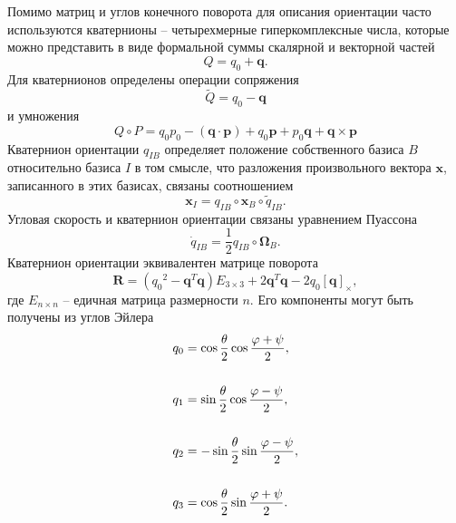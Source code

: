 Помимо матриц и углов конечного поворота для описания ориентации часто используются кватернионы \cite{Amelkin01} -- четырехмерные гиперкомплексные числа, которые можно представить в виде формальной суммы скалярной и векторной частей
\begin{equation} \label{eq:quat_def}
Q = q_0 + \bm{q}.
\end{equation}
Для кватернионов определены операции сопряжения
\begin{equation} \label{eq:quat_dual}
\tilde{Q} = q_0 - \bm{q}
\end{equation}
и умножения
\begin{equation} \label{eq:quat_mult}
Q \circ P = q_0 p_0 - (\bm{q} \cdot \bm{p})
+ q_0 \bm{p} + p_0 \bm{q} + \bm{q} \times \bm{p}
\end{equation}
Кватернион ориентации  $q_{IB}$ определяет положение собственного базиса $B$ относительно базиса $I$ в том смысле, что разложения произвольного вектора $\bm{x}$, записанного в этих базисах, связаны соотношением
\begin{equation} \label{eq:quat}
\bm{x}_I = q_{IB} \circ \bm{x}_B \circ \tilde{q}_{IB}.
\end{equation}
Угловая скорость и кватернион ориентации связаны уравнением Пуассона
\begin{equation} \label{eq:puasson}
\dot{q}_{IB} = \frac{1}{2} {q}_{IB} \circ \bm{\Omega}_B.
\end{equation}
Кватернион ориентации эквивалентен матрице поворота
\begin{equation} \label{eq:quat_to_rotmx}
\bm{R} = ({q_0}^2 - \bm{q}^T \bm{q}) E_{3 \times 3} + 2 \bm{q}^T \bm{q} - 2 {q_0} [\bm{q}]_{\times},
\end{equation}
где $E_{n \times n}$ -- едичная матрица размерности $n$.
Его компоненты могут быть получены из углов Эйлера
\begin{equation}
\begin{aligned}
&{q_0} = \cos \frac{\theta }{2}\cos \frac{{\varphi  + \psi }}{2},
\\
\vspace{3mm}
\\
&{q_1} = \sin\frac{\theta }{2}\cos \frac{{\varphi  - \psi }}{2},
\\
\vspace{3mm}
\\
&{q_2} =  - \sin \frac{\theta }{2}\sin\frac{{\varphi  - \psi }}{2},
\\
\vspace{3mm}
\\
&{q_3} = \cos \frac{\theta }{2}\sin \frac{{\varphi  + \psi }}{2}.
\end{aligned}
\end{equation}

